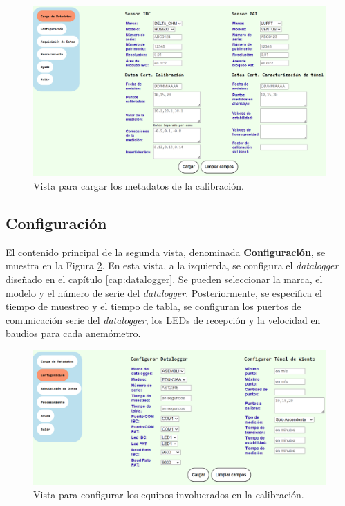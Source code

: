 \begin{figure}[H]
    \centering
    \includegraphics[width=1\linewidth]{Figuras/AplicacionWeb/frontend/cargaMetadata.png}
    \caption{Vista para cargar los metadatos de la calibración.}
    \label{fig:cargaMetadata}
\end{figure}

\subsection{Configuración}\label{sec:configSistema}

El contenido principal de la segunda vista, denominada \textbf{Configuración}, se muestra en la Figura \ref{fig:configEquipos}. En esta vista, a la izquierda, se configura el \textit{datalogger} diseñado en el capítulo \ref{cap:datalogger}. Se pueden seleccionar la marca, el modelo y el número de serie del \textit{datalogger}. Posteriormente, se especifica el tiempo de muestreo y el tiempo de tabla, se configuran los puertos de comunicación serie del \textit{datalogger}, los LEDs de recepción y la velocidad en baudios para cada anemómetro.

\begin{figure}[H]
    \centering
    \includegraphics[width=1\linewidth]{Figuras/AplicacionWeb/frontend/configEquipos.png}
    \caption{Vista para configurar los equipos involucrados en la calibración.}
    \label{fig:configEquipos}
\end{figure}

